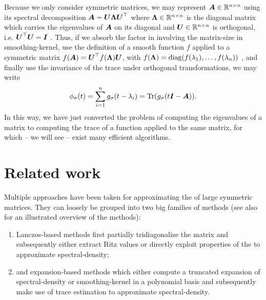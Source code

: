 Because we only consider symmetric matrices, 
we may represent $\boldsymbol{A} \in \mathbb{R}^{n \times n}$ using its spectral
decomposition $\boldsymbol{A} = \boldsymbol{U} \boldsymbol{\Lambda} \boldsymbol{U}^{\top}$ where
$\boldsymbol{\Lambda} \in \mathbb{R}^{n \times n}$ is the diagonal matrix which carries
the eigenvalues of $\boldsymbol{A}$ on its diagonal and $\boldsymbol{U} \in \mathbb{R}^{n \times n}$
is orthogonal, i.e. $\boldsymbol{U}^{\top} \boldsymbol{U} = \boldsymbol{I}$ \cite[theorem~4.1.5]{horn1985matrix}.
Thus, if we absorb the factor in 
involving the \gls{matrix-size} in \gls{smoothing-kernel},
use the definition of a smooth function $f$ applied to a symmetric matrix
$f(\boldsymbol{A}) = \boldsymbol{U}^{\top} f(\boldsymbol{\Lambda}) \boldsymbol{U}$,
with $f(\boldsymbol{\Lambda}) = \operatorname{diag}(f(\lambda_1), \dots, f(\lambda_n))$ \cite[definition~1.2]{higham2008functions},
and finally use the invariance of the trace under orthogonal transformations, we may write
\begin{equation}
    \phi_{\sigma}(t) = \sum_{i=1}^n g_{\sigma}(t - \lambda_i) = \operatorname{Tr}(g_{\sigma}(t\boldsymbol{I} - \boldsymbol{A})).
    \label{equ:1-introduction-spectral-density-as-trace}
\end{equation}
In this way, we have just converted the problem of computing the eigenvalues of
a matrix to computing the trace of a function applied to the same matrix,
for which -- we will see -- exist many efficient algorithms.


\section{Related work}
\label{sec:1-introduction-related}

Multiple approaches have been taken for approximating the 
of large symmetric matrices. They can loosely be grouped into two big families
of methods (see also  for an
illustrated overview of the methods):

\begin{enumerate}
    \item Lanczos-based methods first partially tridiagonalize the matrix and
    subsequently either extract Ritz values or directly exploit properties of the
     to approximate \gls{spectral-density};
    \item and expansion-based methods which either compute a truncated expansion of
    \gls{spectral-density} or \gls{smoothing-kernel} in a polynomial basis and subsequently
    make use of trace estimation to approximate \gls{spectral-density}.
\end{enumerate}

